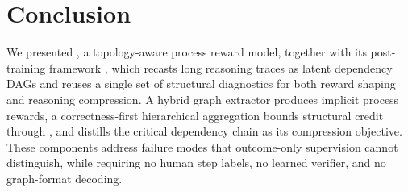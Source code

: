 \section{Conclusion}
\label{sec:conclusion}

We presented \method, a topology-aware process reward model, together with its post-training framework \framework, which recasts long reasoning traces as latent dependency DAGs and reuses a single set of structural diagnostics for both reward shaping and reasoning compression. A hybrid graph extractor produces implicit process rewards, a correctness-first hierarchical aggregation bounds structural credit through \estimation, and \framework distills the critical dependency chain as its compression objective. These components address failure modes that outcome-only supervision cannot distinguish, while requiring no human step labels, no learned verifier, and no graph-format decoding.


\newpage
